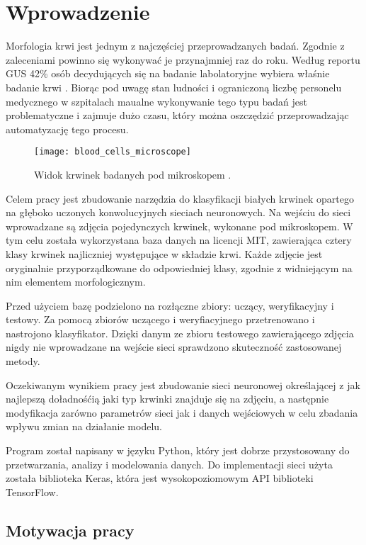 \chapter{Wprowadzenie}
\label{cha:wprowadzenie}
Morfologia krwi jest jednym z najczęściej przeprowadzanych badań. Zgodnie z zaleceniami powinno się wykonywać je przynajmniej raz do roku. Według reportu GUS 42\% osób decydujących się na badanie labolatoryjne wybiera właśnie badanie krwi \cite{GUS_Zdrowie2016}. Biorąc pod uwagę stan ludności i ograniczoną liczbę personelu medycznego w szpitalach maualne wykonywanie tego typu badań jest problematyczne i zajmuje dużo czasu, który można oszczędzić przeprowadzając automatyzację tego procesu.

\begin{figure}[h]
	\centering
		\texttt{[image: blood\_cells\_microscope]}
	\caption{Widok krwinek badanych pod mikroskopem \cite{cells_microscope}.}
\end{figure}

Celem pracy jest zbudowanie narzędzia do klasyfikacji białych krwinek opartego na głęboko uczonych konwolucyjnych sieciach neuronowych. Na wejściu do sieci wprowadzane są zdjęcia pojedynczych krwinek, wykonane pod mikroskopem. W tym celu została wykorzystana baza danych na licencji MIT, zawierająca cztery klasy krwinek najliczniej występujące w składzie krwi. Każde zdjęcie jest oryginalnie przyporządkowane do odpowiedniej klasy, zgodnie z widniejącym na nim elementem morfologicznym. 

Przed użyciem bazę podzielono na rozłączne zbiory: uczący, weryfikacyjny i testowy. Za pomocą zbiorów uczącego i weryfiacyjnego przetrenowano i nastrojono klasyfikator. Dzięki danym ze zbioru testowego zawierającego zdjęcia nigdy nie wprowadzane na wejście sieci sprawdzono skuteczność zastosowanej metody.

Oczekiwanym wynikiem pracy jest zbudowanie sieci neuronowej określającej z jak najlepszą doładnośćią jaki typ krwinki znajduje się na zdjęciu, a następnie modyfikacja zarówno parametrów sieci jak i danych wejściowych w celu zbadania wpływu zmian na działanie modelu.

Program został napisany w języku Python, który jest dobrze przystosowany do przetwarzania, analizy i modelowania danych. Do implementacji sieci użyta została biblioteka Keras, która jest wysokopoziomowym API biblioteki TensorFlow.

\section{Motywacja pracy}
\label{sec:motywacja_pracy}

